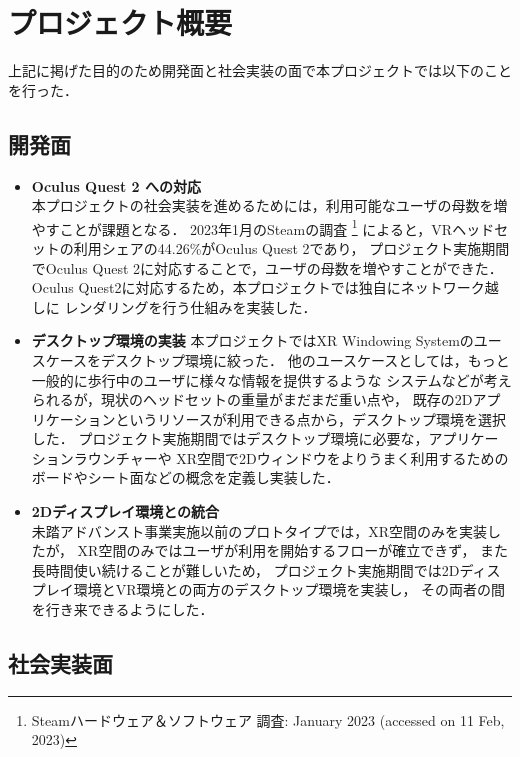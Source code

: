 \section{プロジェクト概要}

上記に掲げた目的のため開発面と社会実装の面で本プロジェクトでは以下のことを行った．

\subsection{開発面}

\begin{itemize}
      \item \textbf{Oculus Quest 2 への対応} \\
            本プロジェクトの社会実装を進めるためには，利用可能なユーザの母数を増やすことが課題となる．
            2023年1月のSteamの調査
            \footnote{Steamハードウェア＆ソフトウェア 調査: January 2023 (accessed on 11 Feb, 2023)}
            によると，VRヘッドセットの利用シェアの44.26\%がOculus Quest 2であり，
            プロジェクト実施期間でOculus Quest 2に対応することで，ユーザの母数を増やすことができた．
            Oculus Quest2に対応するため，本プロジェクトでは独自にネットワーク越しに
            レンダリングを行う仕組みを実装した．
      \item \textbf{デスクトップ環境の実装}
            本プロジェクトではXR Windowing Systemのユースケースをデスクトップ環境に絞った．
            他のユースケースとしては，もっと一般的に歩行中のユーザに様々な情報を提供するような
            システムなどが考えられるが，現状のヘッドセットの重量がまだまだ重い点や，
            既存の2Dアプリケーションというリソースが利用できる点から，デスクトップ環境を選択した．
            プロジェクト実施期間ではデスクトップ環境に必要な，アプリケーションラウンチャーや
            XR空間で2Dウィンドウをよりうまく利用するためのボードやシート面などの概念を定義し実装した．
      \item \textbf{2Dディスプレイ環境との統合} \\
            未踏アドバンスト事業実施以前のプロトタイプでは，XR空間のみを実装したが，
            XR空間のみではユーザが利用を開始するフローが確立できず，
            また長時間使い続けることが難しいため，
            プロジェクト実施期間では2Dディスプレイ環境とVR環境との両方のデスクトップ環境を実装し，
            その両者の間を行き来できるようにした．
\end{itemize}

\subsection{社会実装面}


